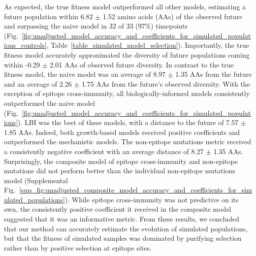 As expected, the true fitness model outperformed all other models, estimating a future population within 6.82 $\pm$ 1.52 amino acids (AAs) of the observed future and surpassing the naive model in 32 of 33 (97\%) timepoints (Fig.~\ref{fig:unadjusted_model_accuracy_and_coefficients_for_simulated_populations_controls}, Table~\ref{table_simulated_model_selection}).
Importantly, the true fitness model accurately approximated the diversity of future populations coming within -0.29 $\pm$ 2.01 AAs of observed future diversity.
In contrast to the true fitness model, the naive model was an average of 8.97 $\pm$ 1.35 AAs from the future and an average of 2.26 $\pm$ 1.75 AAs from the future's observed diversity.
With the exception of epitope cross-immunity, all biologically-informed models consistently outperformed the naive model (Fig.~\ref{fig:unadjusted_model_accuracy_and_coefficients_for_simulated_populations}).
LBI was the best of these models, with a distance to the future of 7.57 $\pm$ 1.85 AAs.
Indeed, both growth-based models received positive coefficients and outperformed the mechanistic models.
The non-epitope mutations metric received a consistently negative coefficient with an average distance of 8.27 $\pm$ 1.35 AAs.
Surprisingly, the composite model of epitope cross-immunity and non-epitope mutations did not perform better than the individual non-epitope mutations model (Supplemental Fig.~\ref{sup_fig:unadjusted_composite_model_accuracy_and_coefficients_for_simulated_populations}).
While epitope cross-immunity was not predictive on its own, the consistently positive coefficient it received in the composite model suggested that it was an informative metric.
From these results, we concluded that our method can accurately estimate the evolution of simulated populations, but that the fitness of simulated samples was dominated by purifying selection rather than by positive selection at epitope sites.

